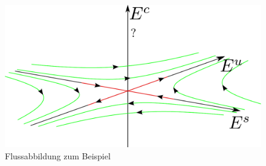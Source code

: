 \documentclass[a4paper, 13pt]{scrreprt}
\theoremstyle{definition} \newtheorem{definition}{Definition}[section]
\begin{document}
\begin{figure}[htpb]
		\centering
		\includegraphics[width=1\textwidth]{img/periodische_orbits/beispiel_asymp_stabilitaet.pdf}
		\caption{Flussabbildung zum Beispiel}
\end{figure}
\end{document}
